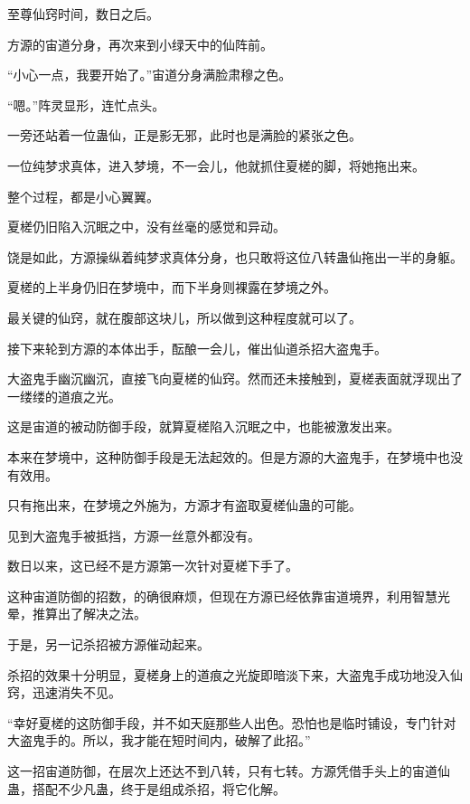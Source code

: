 
\begin{this_body}



至尊仙窍时间，数日之后。

方源的宙道分身，再次来到小绿天中的仙阵前。

“小心一点，我要开始了。”宙道分身满脸肃穆之色。

“嗯。”阵灵显形，连忙点头。

一旁还站着一位蛊仙，正是影无邪，此时也是满脸的紧张之色。

一位纯梦求真体，进入梦境，不一会儿，他就抓住夏槎的脚，将她拖出来。

整个过程，都是小心翼翼。

夏槎仍旧陷入沉眠之中，没有丝毫的感觉和异动。

饶是如此，方源操纵着纯梦求真体分身，也只敢将这位八转蛊仙拖出一半的身躯。

夏槎的上半身仍旧在梦境中，而下半身则裸露在梦境之外。

最关键的仙窍，就在腹部这块儿，所以做到这种程度就可以了。

接下来轮到方源的本体出手，酝酿一会儿，催出仙道杀招大盗鬼手。

大盗鬼手幽沉幽沉，直接飞向夏槎的仙窍。然而还未接触到，夏槎表面就浮现出了一缕缕的道痕之光。

这是宙道的被动防御手段，就算夏槎陷入沉眠之中，也能被激发出来。

本来在梦境中，这种防御手段是无法起效的。但是方源的大盗鬼手，在梦境中也没有效用。

只有拖出来，在梦境之外施为，方源才有盗取夏槎仙蛊的可能。

见到大盗鬼手被抵挡，方源一丝意外都没有。

数日以来，这已经不是方源第一次针对夏槎下手了。

这种宙道防御的招数，的确很麻烦，但现在方源已经依靠宙道境界，利用智慧光晕，推算出了解决之法。

于是，另一记杀招被方源催动起来。

杀招的效果十分明显，夏槎身上的道痕之光旋即暗淡下来，大盗鬼手成功地没入仙窍，迅速消失不见。

“幸好夏槎的这防御手段，并不如天庭那些人出色。恐怕也是临时铺设，专门针对大盗鬼手的。所以，我才能在短时间内，破解了此招。”

这一招宙道防御，在层次上还达不到八转，只有七转。方源凭借手头上的宙道仙蛊，搭配不少凡蛊，终于是组成杀招，将它化解。


\end{this_body}
